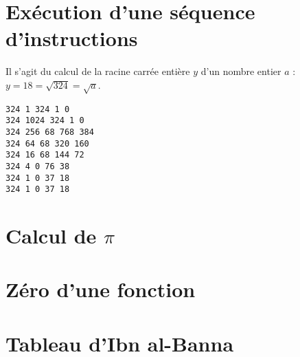 \documentclass[11pt,a4paper]{article}
\begin{document}

\section{Exécution d'une séquence d'instructions}
%

\noindent\begin{minipage}{8cm}
Il s'agit du calcul de la racine carrée entière $y$ d'un nombre entier $a$ :
$y = 18 = \sqrt{324} = \sqrt{a}$.
\end{minipage}
\hfill
\begin{py}{7cm}
\begin{verbatim}
324 1 324 1 0
324 1024 324 1 0
324 256 68 768 384
324 64 68 320 160
324 16 68 144 72
324 4 0 76 38
324 1 0 37 18
324 1 0 37 18
\end{verbatim}
\end{py}

\section{Calcul de $\pi$}


\section{Zéro d'une fonction}


\section{Tableau d'Ibn al-Banna}

\label{fini}
\end{document}
